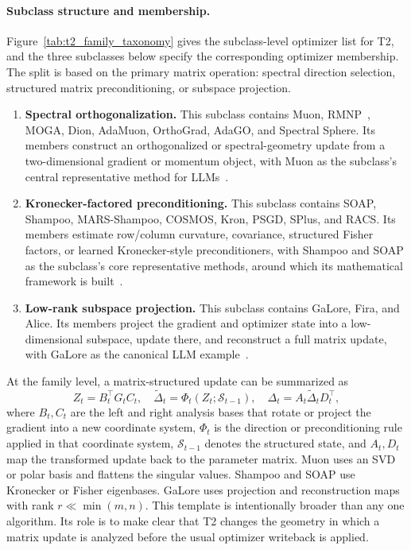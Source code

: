 \paragraph{Subclass structure and membership.}
Figure~\ref{tab:t2_family_taxonomy} gives the subclass-level optimizer list for T2, and the
three subclasses below specify the corresponding optimizer membership.  The
split is based on the primary matrix operation: spectral direction selection,
structured matrix preconditioning, or subspace projection.
\begin{enumerate}[label=\textbf{T2.\arabic*},leftmargin=*,itemsep=2pt]
  \item \textbf{Spectral orthogonalization.}
  This subclass contains Muon, RMNP~\cite{deng2026rmnp}, MOGA, Dion, AdaMuon, OrthoGrad, AdaGO,
  and Spectral Sphere.  Its members construct an orthogonalized or spectral-geometry update
  from a two-dimensional gradient or momentum object, with Muon as the
  subclass's central representative method for LLMs~\citep{jordan2024muon,pethick2025normlmo,sfyraki2025lions}.
  \item \textbf{Kronecker-factored preconditioning.}
  This subclass contains SOAP, Shampoo, MARS-Shampoo, COSMOS, Kron, PSGD,
  SPlus, and RACS.  Its members estimate row/column curvature, covariance, structured Fisher
  factors, or learned Kronecker-style preconditioners, with Shampoo and SOAP as
  the subclass's core representative methods, around which its mathematical
  framework is built~\citep{gupta2018shampoo,vyas2025soap}.
  \item \textbf{Low-rank subspace projection.}
  This subclass contains GaLore, Fira, and Alice.  Its members project the
  gradient and optimizer state into a low-dimensional subspace, update there,
  and reconstruct a full matrix update, with GaLore as the canonical LLM
  example~\citep{zhao2024galore}.
\end{enumerate}

At the family level, a matrix-structured update can be summarized as
\begin{equation}
  Z_t = B_t^\top G_t C_t,\quad
  \widetilde{\Delta}_t = \Phi_t(Z_t;\mathcal{S}_{t-1}),\quad
  \Delta_t = A_t\widetilde{\Delta}_t D_t^\top,
  \label{eq:t2-matrix-template}
\end{equation}
where $B_t,C_t$ are the left and right analysis bases that rotate or project
the gradient into a new coordinate system, $\Phi_t$ is the direction or
preconditioning rule applied in that coordinate system, $\mathcal{S}_{t-1}$
denotes the structured state, and $A_t,D_t$ map the transformed update back to
the parameter matrix.  Muon uses an SVD or polar basis and flattens the
singular values.  Shampoo and SOAP use Kronecker or Fisher eigenbases.  GaLore
uses projection and reconstruction maps with rank $r\ll\min(m,n)$.  This
template is intentionally broader than any one algorithm.  Its role is to make clear
that T2 changes the geometry in which a matrix update is analyzed before the
usual optimizer writeback is applied.

